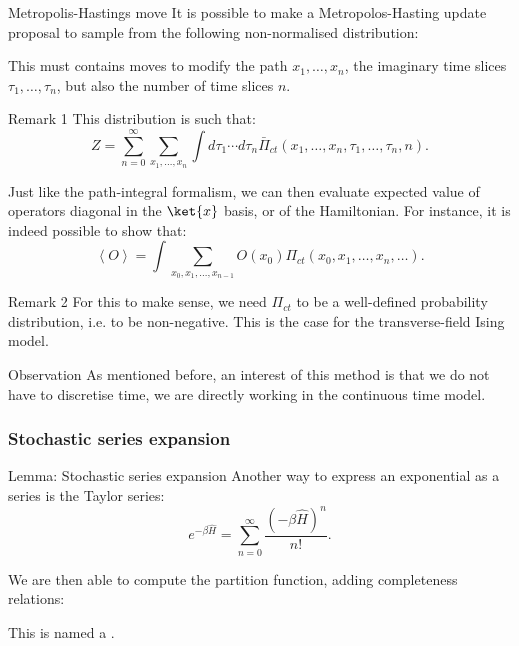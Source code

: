 \documentclass[a4paper]{article}
\begin{document}
\begin{parag}{Metropolis-Hastings move}
    It is possible to make a Metropolos-Hasting update proposal to sample from the following non-normalised distribution:

    This must contains moves to modify the path $x_1, \ldots, x_n$, the imaginary time slices $\tau_1, \ldots, \tau_n$, but also the number of time slices $n$.

    \begin{subparag}{Remark 1}
        This distribution is such that:
        \[Z = \sum_{n=0}^{\infty} \sum_{x_1, \ldots, x_n} \int d\tau_1 \cdots d\tau_n \bar{\Pi}_{ct}\left(x_1, \ldots, x_n, \tau_1, \ldots, \tau_n, n\right).\]

        Just like the path-integral formalism, we can then evaluate expected value of operators diagonal in the $\ket{x}$ basis, or of the Hamiltonian. For instance, it is indeed possible to show that:
        \[\left\langle O \right\rangle = \int \sum_{x_0, x_1, \ldots, x_{n-1}} O\left(x_0\right) \Pi_{ct}\left(x_0, x_1, \ldots, x_n, \ldots\right).\]
    \end{subparag}

    \begin{subparag}{Remark 2}
        For this to make sense, we need $\Pi_{ct}$ to be a well-defined probability distribution, i.e. to be non-negative. This is the case for the transverse-field Ising model.
    \end{subparag}

    \begin{subparag}{Observation}
        As mentioned before, an interest of this method is that we do not have to discretise time, we are directly working in the continuous time model.
    \end{subparag}
\end{parag}


\subsubsection{Stochastic series expansion}

\begin{parag}{Lemma: Stochastic series expansion}
    Another way to express an exponential as a series is the Taylor series: 
    \[e^{-\beta \hat{H}} = \sum_{n=0}^{\infty} \frac{\left(-\beta \hat{H}\right)^n}{n!}.\]

    We are then able to compute the partition function, adding completeness relations: 

    This is named a .
\end{parag}
\end{document}
